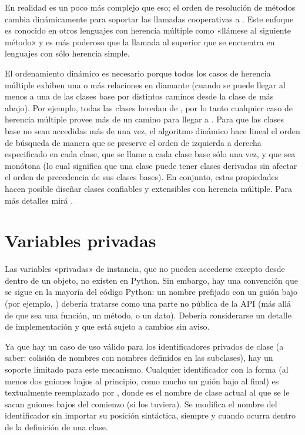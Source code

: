 \documentclass[a5paper,10pt,spanish]{sphinxmanual}
\begin{document}
\sphinxAtStartPar
En realidad es un poco más complejo que eso; el orden de resolución de métodos cambia dinámicamente para soportar las llamadas cooperativas a .  Este enfoque es conocido en otros lenguajes con herencia múltiple como «llámese al siguiente método» y es más poderoso que la llamada al superior que se encuentra en lenguajes con sólo herencia simple.

\sphinxAtStartPar
El ordenamiento dinámico es necesario porque todos los casos de herencia múltiple exhiben una o más relaciones en diamante (cuando se puede llegar al menos a una de las clases base por distintos caminos desde la clase de más abajo).  Por ejemplo, todas las clases heredan de , por lo tanto cualquier caso de herencia múltiple provee más de un camino para llegar a .  Para que las clases base no sean accedidas más de una vez, el algoritmo dinámico hace lineal el orden de búsqueda de manera que se preserve el orden de izquierda a derecha especificado en cada clase, que se llame a cada clase base sólo una vez, y que sea monótona (lo cual significa que una clase puede tener clases derivadas sin afectar el orden de precedencia de sus clases bases).  En conjunto, estas propiedades hacen posible diseñar clases confiables y extensibles con herencia múltiple. Para más detalles mirá  .


\section{Variables privadas}
\label{\detokenize{tutorial/classes:private-variables}}\label{\detokenize{tutorial/classes:tut-private}}
\sphinxAtStartPar
Las variables «privadas» de instancia, que no pueden accederse excepto desde dentro de un objeto, no existen en Python.  Sin embargo, hay una convención que se sigue en la mayoría del código Python: un nombre prefijado con un guión bajo (por ejemplo, ) debería tratarse como una parte no pública de la API (más allá de que sea una función, un método, o un dato).  Debería considerarse un detalle de implementación y que está sujeto a cambios sin aviso.

\ignorespaces 
\sphinxAtStartPar
Ya que hay un caso de uso válido para los identificadores privados de clase (a saber: colisión de nombres con nombres definidos en las subclases), hay un soporte limitado para este mecanismo.  Cualquier identificador con la forma  (al menos dos guiones bajos al principio, como mucho un guión bajo al final) es textualmente reemplazado por , donde  es el nombre de clase actual al que se le sacan guiones bajos del comienzo (si los tuviera).  Se modifica el nombre del identificador sin importar su posición sintáctica, siempre y cuando ocurra dentro de la definición de una clase.
\end{document}
